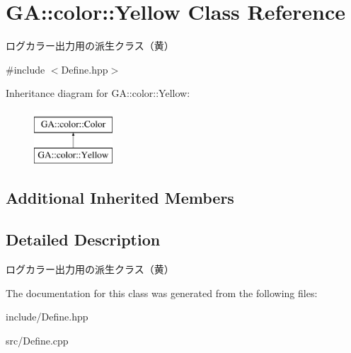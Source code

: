 \hypertarget{class_g_a_1_1color_1_1_yellow}{}\section{GA\+::color\+::Yellow Class Reference}
\label{class_g_a_1_1color_1_1_yellow}


ログカラー出力用の派生クラス（黄）  




{\ttfamily \#include $<$Define.\+hpp$>$}

Inheritance diagram for GA\+::color\+::Yellow\+:\begin{figure}[H]
\begin{center}
\leavevmode
\includegraphics[height=2.000000cm]{class_g_a_1_1color_1_1_yellow}
\end{center}
\end{figure}
\subsection*{Additional Inherited Members}


\subsection{Detailed Description}
ログカラー出力用の派生クラス（黄） 



The documentation for this class was generated from the following files\+:\begin{DoxyCompactItemize}
\item 
include/Define.\+hpp\item 
src/Define.\+cpp\end{DoxyCompactItemize}

